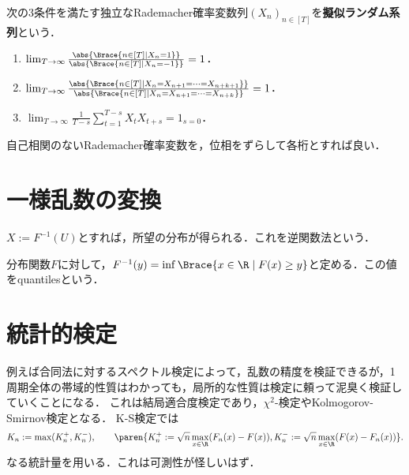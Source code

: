 \documentclass[uplatex,dvipdfmx]{jsreport}
\begin{document}
\begin{definition}
    次の3条件を満たす独立なRademacher確率変数列$(X_n)_{n\in[T]}$を\textbf{擬似ランダム系列}という．
    \begin{enumerate}
        \item $\lim_{T\to\infty}\frac{\abs{\Brace{n\in[T]\mid X_n=1}}}{\abs{\Brace{n\in[T]\mid X_n=-1}}}=1$．
        \item $\lim_{T\to\infty}\frac{\abs{\Brace{n\in[T]\mid X_n=X_{n+1}=\cdots=X_{n+k+1}}}}{\abs{\Brace{n\in[T]\mid X_n=X_{n+1}=\cdots=X_{n+k}}}}=1$．
        \item $\lim_{T\to\infty}\frac{1}{T-s}\sum_{t=1}^{T-s}X_tX_{t+s}=1_{s=0}$．
    \end{enumerate}
\end{definition}
\begin{remarks}
    自己相関のないRademacher確率変数を，位相をずらして各桁とすれば良い．
\end{remarks}

\section{一様乱数の変換}

\begin{tcolorbox}[colframe=ForestGreen, colback=ForestGreen!10!white,breakable,colbacktitle=ForestGreen!40!white,coltitle=black,fonttitle=\bfseries\sffamily,
title=]
    $X:=F^{-1}(U)$とすれば，所望の分布が得られる．これを逆関数法という．
\end{tcolorbox}

\begin{notation}
    分布関数$F$に対して，$F^{-1}(y)=\inf\Brace{x\in\R\mid F(x)\ge y}$と定める．この値をquantilesという．
\end{notation}

\section{統計的検定}

\begin{tcolorbox}[colframe=ForestGreen, colback=ForestGreen!10!white,breakable,colbacktitle=ForestGreen!40!white,coltitle=black,fonttitle=\bfseries\sffamily,
title=]
    例えば合同法に対するスペクトル検定によって，乱数の精度を検証できるが，1周期全体の帯域的性質はわかっても，局所的な性質は検定に頼って泥臭く検証していくことになる．
    これは結局適合度検定であり，$\chi^2$-検定やKolmogorov-Smirnov検定となる．
    K-S検定では
    \[K_n:=\max(K_n^+,K_n^-),\qquad\paren{K_n^+:=\sqrt{n}\max_{x\in\R}(F_n(x)-F(x)),K_n^-:=\sqrt{n}\max_{x\in\R}(F(x)-F_n(x))}.\]
    なる統計量を用いる．これは可測性が怪しいはず．
\end{tcolorbox}
\end{document}

